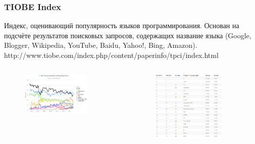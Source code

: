 \documentclass[default]{beamer}
\begin{document}
	\begin{frame}
	\frametitle{TIOBE Index}
	
	Индекс, оценивающий популярность языков программирования. Основан на подсчёте
	результатов поисковых запросов, содержащих название языка (Google, Blogger,
	Wikipedia, YouTube, Baidu, Yahoo!, Bing, Amazon).
	http://www.tiobe.com/index.php/content/paperinfo/tpci/index.html
	
	\begin{columns}
	\begin{column}{0.5\textwidth}
	\begin{figure}
	\includegraphics[width=0.8\textwidth]{tiobe_graph}
	\end{figure}
	\end{column}
	\begin{column}{0.5\textwidth}
	\begin{figure}
	\includegraphics[width=0.8\textwidth]{tiobe_table}
	\end{figure}
	\end{column}	
	\end{columns}
	\end{frame}
	
\end{document}
